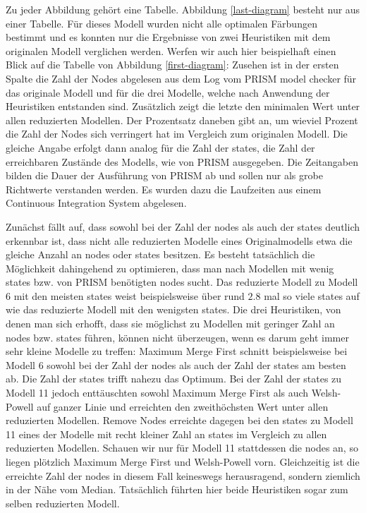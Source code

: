 \documentclass[a4paper]{article}
\theoremstyle{nonumberplain}
\begin{document}
Zu jeder Abbildung gehört eine Tabelle. Abbildung \ref{last-diagram} besteht nur aus einer Tabelle. Für dieses Modell wurden nicht alle optimalen Färbungen bestimmt und es konnten nur die Ergebnisse von zwei Heuristiken mit dem originalen Modell verglichen werden. Werfen wir auch hier beispielhaft einen Blick auf die Tabelle von Abbildung \ref{first-diagram}: Zusehen ist in der ersten Spalte die Zahl der Nodes abgelesen aus dem Log vom PRISM model checker für das originale Modell und für die drei Modelle, welche nach Anwendung der Heuristiken entstanden sind. Zusätzlich zeigt die letzte den minimalen Wert unter allen reduzierten Modellen. Der Prozentsatz daneben gibt an, um wieviel Prozent die Zahl der Nodes sich verringert hat im Vergleich zum originalen Modell. Die gleiche Angabe erfolgt dann analog für die Zahl der states, die Zahl der erreichbaren Zustände des Modells, wie von PRISM ausgegeben. Die Zeitangaben bilden die Dauer der Ausführung von PRISM ab und sollen nur als grobe Richtwerte verstanden werden. Es wurden dazu die Laufzeiten aus einem Continuous Integration System abgelesen.


Zunächst fällt auf, dass sowohl bei der Zahl der nodes als auch der states deutlich erkennbar ist, dass nicht alle reduzierten Modelle eines Originalmodells etwa die gleiche Anzahl an nodes oder states besitzen.
Es besteht tatsächlich die Möglichkeit dahingehend zu optimieren, dass man nach Modellen mit wenig states bzw. von PRISM benötigten nodes sucht. Das reduzierte Modell zu Modell 6 mit den meisten states weist beispielsweise über rund $2.8$ mal so viele states auf wie das reduzierte Modell mit den wenigsten states.
Die drei Heuristiken, von denen man sich erhofft, dass sie möglichst zu Modellen mit geringer Zahl an nodes bzw. states führen, können nicht überzeugen, wenn es darum geht immer sehr kleine Modelle zu treffen:
Maximum Merge First schnitt beispielsweise bei Modell 6 sowohl bei der Zahl der nodes als auch der Zahl der states am besten ab. Die Zahl der states trifft nahezu das Optimum. Bei der Zahl der states zu Modell 11 jedoch enttäuschten sowohl Maximum Merge First als auch Welsh-Powell auf ganzer Linie und erreichten den zweithöchsten Wert unter allen reduzierten Modellen. Remove Nodes erreichte dagegen bei den states zu Modell 11 eines der Modelle mit recht kleiner Zahl an states im Vergleich zu allen reduzierten Modellen. Schauen wir nur für Modell 11 stattdessen die nodes an, so liegen plötzlich Maximum Merge First und Welsh-Powell vorn. Gleichzeitig ist die erreichte Zahl der nodes in diesem Fall keineswegs herausragend, sondern ziemlich in der Nähe vom Median. Tatsächlich führten hier beide Heuristiken sogar zum selben reduzierten Modell.
\end{document}

